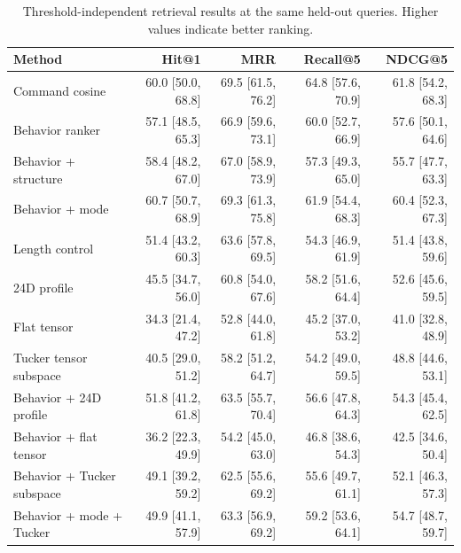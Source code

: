 \begin{table}[t]
\centering
\scriptsize
\setlength{\tabcolsep}{4pt}
\begin{tabular}{lrrrr}
\toprule
Method & Hit@1 & MRR & Recall@5 & NDCG@5 \\
\midrule
Command cosine & 60.0 [50.0, 68.8] & 69.5 [61.5, 76.2] & 64.8 [57.6, 70.9] & 61.8 [54.2, 68.3] \\
Behavior ranker & 57.1 [48.5, 65.3] & 66.9 [59.6, 73.1] & 60.0 [52.7, 66.9] & 57.6 [50.1, 64.6] \\
Behavior + structure & 58.4 [48.2, 67.0] & 67.0 [58.9, 73.9] & 57.3 [49.3, 65.0] & 55.7 [47.7, 63.3] \\
Behavior + mode & 60.7 [50.7, 68.9] & 69.3 [61.3, 75.8] & 61.9 [54.4, 68.3] & 60.4 [52.3, 67.3] \\
Length control & 51.4 [43.2, 60.3] & 63.6 [57.8, 69.5] & 54.3 [46.9, 61.9] & 51.4 [43.8, 59.6] \\
24D profile & 45.5 [34.7, 56.0] & 60.8 [54.0, 67.6] & 58.2 [51.6, 64.4] & 52.6 [45.6, 59.5] \\
Flat tensor & 34.3 [21.4, 47.2] & 52.8 [44.0, 61.8] & 45.2 [37.0, 53.2] & 41.0 [32.8, 48.9] \\
Tucker tensor subspace & 40.5 [29.0, 51.2] & 58.2 [51.2, 64.7] & 54.2 [49.0, 59.5] & 48.8 [44.6, 53.1] \\
Behavior + 24D profile & 51.8 [41.2, 61.8] & 63.5 [55.7, 70.4] & 56.6 [47.8, 64.3] & 54.3 [45.4, 62.5] \\
Behavior + flat tensor & 36.2 [22.3, 49.9] & 54.2 [45.0, 63.0] & 46.8 [38.6, 54.3] & 42.5 [34.6, 50.4] \\
Behavior + Tucker subspace & 49.1 [39.2, 59.2] & 62.5 [55.6, 69.2] & 55.6 [49.7, 61.1] & 52.1 [46.3, 57.3] \\
Behavior + mode + Tucker & 49.9 [41.1, 57.9] & 63.3 [56.9, 69.2] & 59.2 [53.6, 64.1] & 54.7 [48.7, 59.7] \\
\bottomrule
\end{tabular}
\caption{Threshold-independent retrieval results at the same held-out queries. Higher values indicate better ranking.}
\label{tab:multidimensional-profile-ranking}
\end{table}

